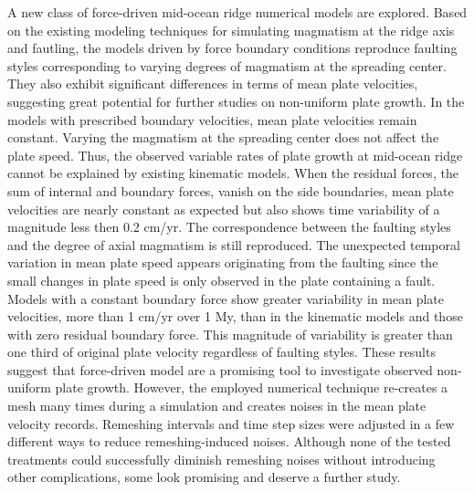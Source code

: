 \documentclass[letterpaper,12pt,notitle]{memphisthesis}                     %
\begin{document}
A new class of force-driven mid-ocean ridge numerical models are explored. 
Based on the existing modeling techniques for simulating magmatism at the ridge axis and fautling, the models driven by force boundary conditions reproduce faulting styles corresponding to varying degrees of magmatism at the spreading center. They also exhibit significant differences in terms of mean plate velocities, suggesting great potential for further studies on non-uniform plate growth. In the models with prescribed boundary velocities, mean plate velocities remain constant. Varying the magmatism at the spreading center does not affect the plate speed. Thus, the observed variable rates of plate growth at mid-ocean ridge cannot be explained by existing kinematic models. When the residual forces, the sum of internal and boundary forces, vanish on the side boundaries, mean plate velocities are nearly constant as expected but also shows time variability of a magnitude less then 0.2 cm/yr. The correspondence between the faulting styles and the degree of axial magmatism is still reproduced. The unexpected temporal variation in mean plate speed appears originating from the faulting since the small changes in plate speed is only observed in the plate containing a fault. %
Models with a constant boundary force show greater variability in mean plate velocities, more than 1 cm/yr over 1 My, than in the kinematic models and those with zero residual boundary force. This magnitude of variability is greater than one third of original plate velocity regardless of faulting styles. These results suggest that force-driven model are a promising tool to investigate observed non-uniform plate growth. However, the employed numerical technique re-creates a mesh many times during a simulation and creates noises in the mean plate velocity records. Remeshing intervals and time step sizes were adjusted in a few different ways to reduce remeshing-induced noises. Although none of the tested treatments could successfully diminish remeshing noises without introducing other complications, some look promising and deserve a further study.

\end{document}
